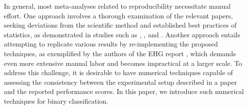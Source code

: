 \documentclass[5p, final]{elsarticle}
\begin{document}
In general, most meta-analyses \cite{metaresearch} related to reproducibility necessitate manual effort. One approach involves a thorough examination of the relevant papers, seeking deviations from the scientific method and established best practices of statistics, as demonstrated in studies such as \cite{psychiatry}, \cite{csecurity}, and \cite{satellite}. Another approach entails attempting to replicate various results by re-implementing the proposed techniques, as exemplified by the authors of the EHG report \cite{ehg}, which demands even more extensive manual labor and becomes impractical at a larger scale.
To address this challenge, it is desirable to have numerical techniques capable of assessing the consistency between the experimental setup described in a paper and the reported performance scores. In this paper, we introduce such numerical techniques for binary classification.
\end{document}
